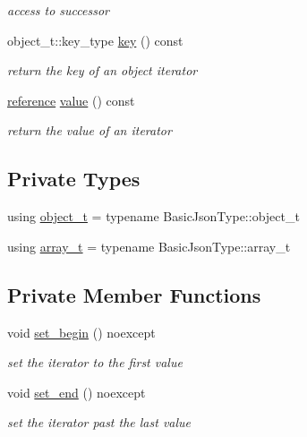 \begin{DoxyCompactItemize}
\begin{DoxyCompactList}\small\item\em access to successor \end{DoxyCompactList}\item 
object\+\_\+t\+::key\+\_\+type \hyperlink{classnlohmann_1_1detail_1_1iter__impl_a3a541a223320f6635f2f188ba54f8818}{key} () const
\begin{DoxyCompactList}\small\item\em return the key of an object iterator \end{DoxyCompactList}\item 
\hyperlink{classnlohmann_1_1detail_1_1iter__impl_a5be8001be099c6b82310f4d387b953ce}{reference} \hyperlink{classnlohmann_1_1detail_1_1iter__impl_ab447c50354c6611fa2ae0100ac17845c}{value} () const
\begin{DoxyCompactList}\small\item\em return the value of an iterator \end{DoxyCompactList}\end{DoxyCompactItemize}
\subsection*{Private Types}
\begin{DoxyCompactItemize}
\item 
using \hyperlink{classnlohmann_1_1detail_1_1iter__impl_ab9a9598052e83fa14a2288e56d5dda7c}{object\+\_\+t} = typename Basic\+Json\+Type\+::object\+\_\+t
\item 
using \hyperlink{classnlohmann_1_1detail_1_1iter__impl_aef02cf75b1cb199286fd2f666c60e38e}{array\+\_\+t} = typename Basic\+Json\+Type\+::array\+\_\+t
\end{DoxyCompactItemize}
\subsection*{Private Member Functions}
\begin{DoxyCompactItemize}
\item 
void \hyperlink{classnlohmann_1_1detail_1_1iter__impl_a5d5f92c7f6848814bc82cf7e4e541820}{set\+\_\+begin} () noexcept
\begin{DoxyCompactList}\small\item\em set the iterator to the first value \end{DoxyCompactList}\item 
void \hyperlink{classnlohmann_1_1detail_1_1iter__impl_a23e50ad4c13aa62d9ac7f60a123823ee}{set\+\_\+end} () noexcept
\begin{DoxyCompactList}\small\item\em set the iterator past the last value \end{DoxyCompactList}\end{DoxyCompactItemize}

